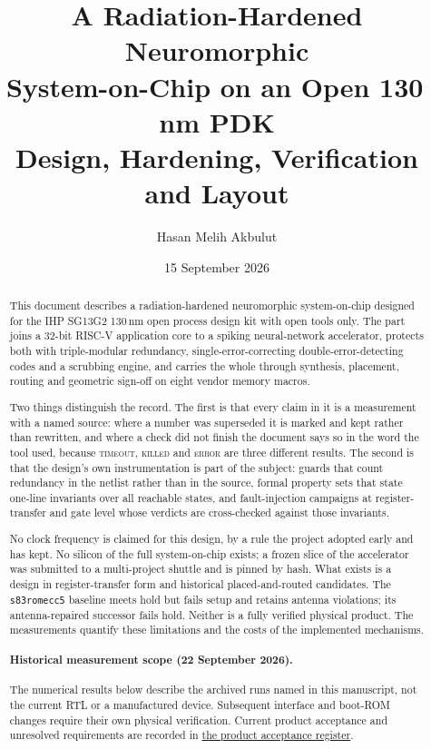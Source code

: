 \documentclass[11pt,a4paper,oneside]{report}
\title{\bfseries A Radiation-Hardened Neuromorphic\\System-on-Chip on an Open 130\,nm PDK\\[0.4em]
\large Design, Hardening, Verification and Layout}
\author{Hasan Melih Akbulut}
\date{15 September 2026}
\begin{document}
\maketitle
\thispagestyle{empty}

\begin{abstract}
\noindent
This document describes a radiation-hardened neuromorphic
system-on-chip designed for the IHP SG13G2 130\,nm open process design
kit with open tools only. The part joins a 32-bit RISC-V application
core to a spiking neural-network accelerator, protects both with
triple-modular redundancy, single-error-correcting double-error-detecting
codes and a scrubbing engine, and carries the whole through synthesis,
placement, routing and geometric sign-off on eight vendor memory macros.

Two things distinguish the record. The first is that every claim in it
is a measurement with a named source: where a number was superseded it
is marked and kept rather than rewritten, and where a check did not
finish the document says so in the word the tool used, because
\textsc{timeout}, \textsc{killed} and \textsc{error} are three
different results. The second is that the design's own instrumentation
is part of the subject: guards that count redundancy in the netlist
rather than in the source, formal property sets that state one-line
invariants over all reachable states, and fault-injection campaigns at
register-transfer and gate level whose verdicts are cross-checked
against those invariants.

No clock frequency is claimed for this design, by a rule the project
adopted early and has kept. No silicon of the full system-on-chip
exists; a frozen slice of the accelerator was submitted to a
multi-project shuttle and is pinned by hash. What exists is a design in
register-transfer form and historical placed-and-routed candidates. The
\texttt{s83romecc5} baseline meets hold but fails setup and retains antenna
violations; its antenna-repaired successor fails hold. Neither is a fully
verified physical product. The measurements quantify these limitations
and the costs of the implemented mechanisms.
\paragraph{Historical measurement scope (22 September 2026).}
The numerical results below describe the archived runs named in this
manuscript, not the current RTL or a manufactured device. Subsequent
interface and boot-ROM changes require their own physical verification.
Current product acceptance and unresolved requirements are recorded in
\href{https://github.com/Melihakbulut221/nssoc/blob/codex/complete-open-work/docs/92-product-acceptance.md}{the product acceptance register}.
\end{abstract}


\clearpage
\tableofcontents
\clearpage
\listoffigures
\clearpage












\end{document}
